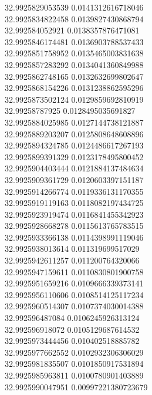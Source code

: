 {32.9925829053539	0.0141312616718046\\
32.9925834822458	0.0139827430868794\\
32.992584052921	0.0138357876471081\\
32.9925846174481	0.0136903788537433\\
32.9925851758952	0.0135465003831638\\
32.9925857283292	0.0134041360849988\\
32.9925862748165	0.0132632699802647\\
32.9925868154226	0.0131238862595296\\
32.9925873502124	0.0129859692810919\\
32.99258787925	0.0128495035691827\\
32.9925884025985	0.0127144738121887\\
32.9925889203207	0.0125808648608896\\
32.9925894324785	0.0124486617267193\\
32.9925899391329	0.0123178495800452\\
32.9925904403444	0.0121884137484634\\
32.9925909361729	0.0120603397151187\\
32.9925914266774	0.0119336131170355\\
32.9925919119163	0.0118082197434725\\
32.9925923919474	0.0116841455342923\\
32.9925928668278	0.0115613765783515\\
32.9925933366138	0.0114398991119046\\
32.9925938013614	0.011319699517029\\
32.9925942611257	0.011200764320066\\
32.9925947159611	0.0110830801900758\\
32.9925951659216	0.0109666339373141\\
32.9925956110606	0.0108514125117234\\
32.9925960514307	0.0107374030014388\\
32.992596487084	0.0106245926313124\\
32.992596918072	0.0105129687614532\\
32.9925973444456	0.010402518885782\\
32.9925977662552	0.0102932306306029\\
32.9925981835507	0.0101850917531894\\
32.9925985963811	0.0100780901403889\\
32.9925990047951	0.00997221380723679\\
}
